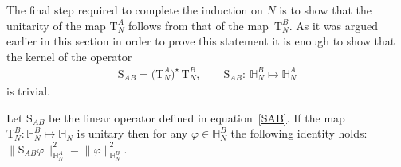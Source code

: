 The final step required to complete the induction on $N$ is to show that the unitarity of the map $\mathrm T_N^A$ follows from that
of the map~$\mathrm T_N^B$. As it was argued earlier in this section in order to prove this statement it is enough to show that the kernel of the operator
\begin{gather}\label{SAB}
\mathrm S_{AB}=\big(\mathrm T_N^A\big)^{\star} \,\mathrm T_N^B, \qquad
\mathrm S_{AB}\colon\ \mathbb H_N^B\mapsto \mathbb H_N^A
\end{gather}
is trivial.

\begin{Lemma}
Let $\mathrm S_{AB}$ be the linear operator defined in equation~\eqref{SAB}. If the map $\mathrm T_N^B\colon \mathbb H_N^{B}\mapsto \mathbb H_N$
is unitary then for any $\varphi\in \mathbb H_N^B$ the following identity holds: $\|\mathrm S_{AB}\varphi\|^2_{\mathbb
H_N^{A}}=\|\varphi\|^2_{\mathbb H_N^B}$.
\label{Lemme isometrie operateur SAB}
\end{Lemma}

